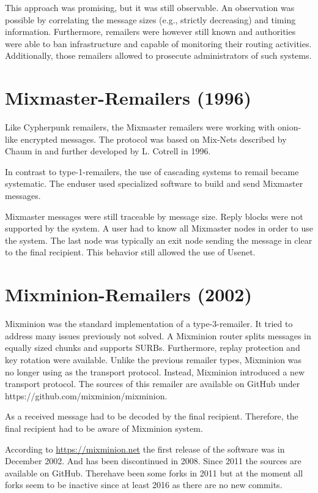 This approach was promising, but it was still observable. An observation was possible by correlating the message sizes (e.g., strictly decreasing) and timing information. Furthermore, remailers were however still known and authorities were able to ban infrastructure and capable of monitoring their routing activities. Additionally, those remailers allowed to prosecute administrators of such systems.

\section{Mixmaster-Remailers (1996)\label{sec:remMixmaster}}
Like Cypherpunk remailers, the Mixmaster remailers were working with onion-like encrypted messages. The protocol was based on Mix-Nets described by Chaum in \cite{CHAUM1} and further developed by L. Cotrell in 1996. 

In contrast to type-1-remailers, the use of cascading systems to remail became systematic. The enduser used specialized software to build and send Mixmaster messages.

Mixmaster messages were still traceable by message size. Reply blocks were not supported by the system. A user had to know all Mixmaster nodes in order to use the system. The last node was typically an exit node sending the message in clear to the final recipient. This behavior still allowed the use of Usenet.


\section{Mixminion-Remailers (2002)\label{sec:remMixminion}}
Mixminion was the standard implementation of a type-3-remailer. It tried to address many issues previously not solved. A Mixminion router splits messages in equally sized chunks and supports SURBs. Furthermore,  replay protection and key rotation were available. Unlike the previous remailer types, Mixminion was no longer using  as the transport protocol. Instead, Mixminion introduced a new transport protocol. The sources of this remailer are available on GitHub under https://github.com/mixminion/mixminion.

As a received message had to be decoded by the final recipient. Therefore, the final recipient had to be aware of Mixminion system.

According to \url{https://mixminion.net} the first release of the software was in December 2002. And has been discontinued in 2008. Since 2011 the sources are available on GitHub. Therehave been some forks in 2011 but at the moment all forks seem to be inactive since at least 2016 as there are no new commits.


